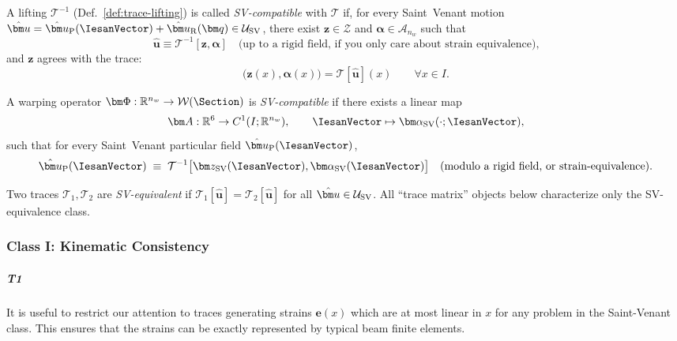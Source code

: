 \begin{definition}[SV-Compatible]
\label{def:sv-compatible-lifting}
A lifting $\mathcal T^{-1}$ (Def.~\ref{def:trace-lifting}) is called \emph{SV-compatible}
with $\mathcal T$ if, for every Saint~Venant motion
$\hat{\bm u}=\hat{\bm u}_{\rm P}(\IesanVector)+\hat{\bm u}_{\rm R}(\bm q)\in\mathcal U_{\rm SV}$,
there exist $\bm z\in\mathcal Z$ and $\bm\alpha\in\mathcal A_{n_w}$ such that
\[
\hat{\bm u} \equiv \mathcal T^{-1}[\bm z,\bm\alpha]
\quad\text{(up to a rigid field, if you only care about strain equivalence),}
\]
and $\bm z$ agrees with the trace:
\[
\big(\bm{z}(x),\bm{\alpha}(x)\big)=\mathcal T[\hat{\bm u}](x)\qquad \forall x\in I.
\]

A warping operator $\bm\Phi:\mathbb R^{n_w}\to\mathcal W(\Section)$ is \emph{SV-compatible}
if there exists a linear map
\[
\bm A:\mathbb R^6\to C^1(I;\mathbb R^{n_w}),\qquad
\IesanVector\mapsto \bm\alpha_{\rm SV}(\cdot;\IesanVector),
\]
such that for every Saint~Venant particular field $\hat{\bm u}_{\rm P}(\IesanVector)$,
\[
\hat{\bm u}_{\rm P}(\IesanVector)\;\equiv\; \mathcal T^{-1}\big[\bm z_{\rm SV}(\IesanVector),\bm\alpha_{\rm SV}(\IesanVector)\big]
\quad\text{(modulo a rigid field, or strain-equivalence).}
\]
\end{definition}

\begin{definition}
\label{def:sv-equivalence}
Two traces $\mathcal T_1,\mathcal T_2$ are \emph{SV-equivalent} if
$\mathcal T_1[\hat{\bm u}]=\mathcal T_2[\hat{\bm u}]$ for all $\hat{\bm u}\in\mathcal U_{\rm SV}$.
All “trace matrix” objects below characterize only the SV-equivalence class.
\end{definition}

\subsubsection{Class I: Kinematic Consistency}

\subparagraph{T1}
It is useful to restrict our attention to traces generating strains \(\bm{e}(x)\) which are at most linear in $x$ for any problem in the Saint-Venant class.
This ensures that the strains can be exactly represented by typical beam finite elements.

